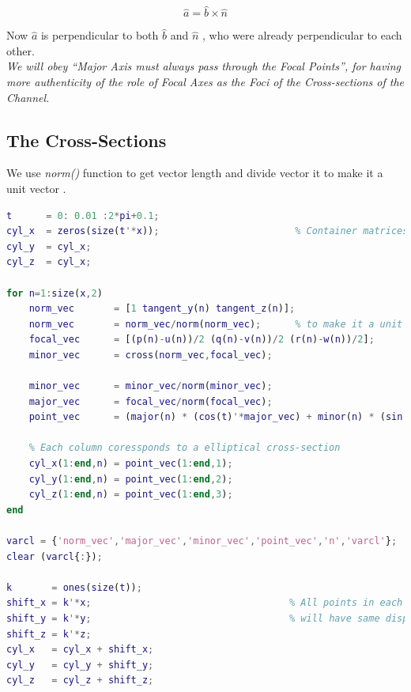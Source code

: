 \documentclass[a4paper]{article}
\begin{document}
\[\hat{a} = \hat{b} \times \hat{n}\]

Now \(\hat{a}\) is perpendicular to both \(\hat{b}\) and
\(\hat{n}\) , who were already perpendicular to each other.
\\
\textit{We will obey ``Major Axis must always pass through the Focal Points'', for having more authenticity of the role of Focal Axes as the Foci of the Cross-sections of the Channel.}

\hypertarget{the-cross-sections}{%
\subsection{The Cross-Sections}\label{the-cross-sections}}
We use \textit{norm()} function to get vector length and divide vector it to make it a unit vector \cite{mathworks_norm}.
\begin{lstlisting}[language=matlab]
t      = 0: 0.01 :2*pi+0.1;
cyl_x  = zeros(size(t'*x));                        % Container matrices for coordinates
cyl_y  = cyl_x;
cyl_z  = cyl_x;

for n=1:size(x,2)
    norm_vec       = [1 tangent_y(n) tangent_z(n)];
    norm_vec       = norm_vec/norm(norm_vec);      % to make it a unit vector
    focal_vec      = [(p(n)-u(n))/2 (q(n)-v(n))/2 (r(n)-w(n))/2];
    minor_vec      = cross(norm_vec,focal_vec);
    
    minor_vec      = minor_vec/norm(minor_vec);
    major_vec      = focal_vec/norm(focal_vec);
    point_vec      = (major(n) * (cos(t)'*major_vec) + minor(n) * (sin(t)'*minor_vec));
 
    % Each column coressponds to a elliptical cross-section
    cyl_x(1:end,n) = point_vec(1:end,1);
    cyl_y(1:end,n) = point_vec(1:end,2);
    cyl_z(1:end,n) = point_vec(1:end,3);
end

varcl = {'norm_vec','major_vec','minor_vec','point_vec','n','varcl'};
clear (varcl{:});

k       = ones(size(t));                       
shift_x = k'*x;                                   % All points in each column
shift_y = k'*y;                                   % will have same displacement
shift_z = k'*z;
cyl_x   = cyl_x + shift_x;
cyl_y   = cyl_y + shift_y;
cyl_z   = cyl_z + shift_z;

\end{lstlisting}
\end{document}
